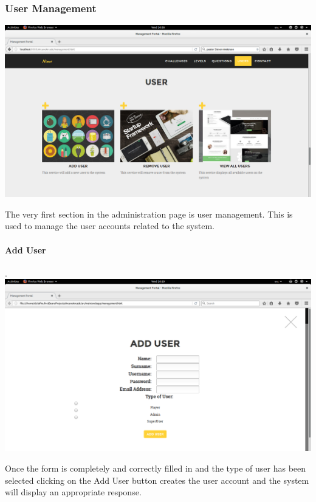 \documentclass[english]{article}
\begin{document}
			\subsubsection{User Management}
				\includegraphics[width=\linewidth]{User.png}				\newline

				The very first section in the administration page is user management. This is used to manage the user accounts related to the system.
				\\[10pt]\newline
				
				\newpage
				\paragraph{Add User}. \\ \newline
				\includegraphics[width=\linewidth]{AddUser.png}				\newline

Once the form is completely and correctly filled in and the type of user has been selected clicking on the Add User button creates the user account and the system will display an appropriate response.
				\\[10pt]
				
\end{document}
